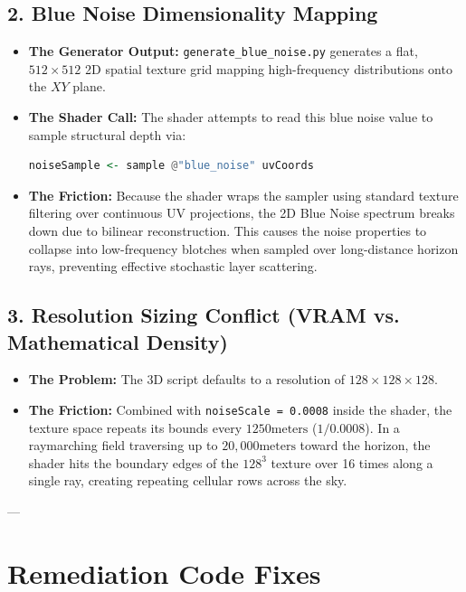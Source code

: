 \documentclass[11pt,a4paper]{article}
\begin{document}
\subsection{2. Blue Noise Dimensionality Mapping}
\begin{itemize}
    \item \textbf{The Generator Output:} \texttt{generate\_blue\_noise.py} generates a flat, $512 \times 512$ 2D spatial texture grid mapping high-frequency distributions onto the $XY$ plane.
    \item \textbf{The Shader Call:} The shader attempts to read this blue noise value to sample structural depth via:
    \begin{lstlisting}[language=Haskell]
    noiseSample <- sample @"blue_noise" uvCoords
    \end{lstlisting}
    \item \textbf{The Friction:} Because the shader wraps the sampler using standard texture filtering over continuous UV projections, the 2D Blue Noise spectrum breaks down due to bilinear reconstruction. This causes the noise properties to collapse into low-frequency blotches when sampled over long-distance horizon rays, preventing effective stochastic layer scattering.
\end{itemize}

\subsection{3. Resolution Sizing Conflict (VRAM vs. Mathematical Density)}
\begin{itemize}
    \item \textbf{The Problem:} The 3D script defaults to a resolution of $128 \times 128 \times 128$. 
    \item \textbf{The Friction:} Combined with \texttt{noiseScale = 0.0008} inside the shader, the texture space repeats its bounds every $1250\text{meters}$ ($1 / 0.0008$). In a raymarching field traversing up to $20,000\text{meters}$ toward the horizon, the shader hits the boundary edges of the $128^3$ texture over 16 times along a single ray, creating repeating cellular rows across the sky.
\end{itemize}

---

\section{Remediation Code Fixes}
\end{document}
